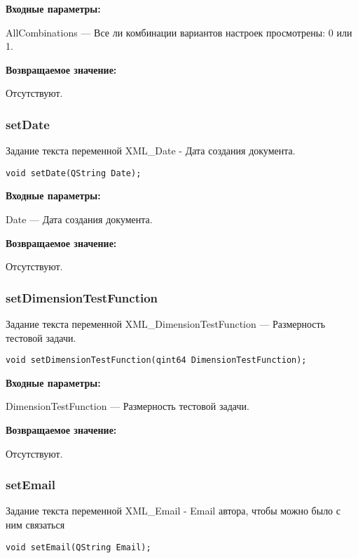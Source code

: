 \documentclass[a4paper,12pt]{article}
\begin{document}
\textbf{Входные параметры:}

AllCombinations --- Все ли комбинации вариантов настроек просмотрены: 0 или 1.

\textbf{Возвращаемое значение:}

Отсутствуют.


\subsubsection{setDate}\label{setDate}

Задание текста переменной  XML\_Date - Дата создания документа.


\begin{lstlisting}[label=code_syntax_setDate,caption=Синтаксис]
void setDate(QString Date);
\end{lstlisting}

\textbf{Входные параметры:}

Date --- Дата создания документа.

\textbf{Возвращаемое значение:}

Отсутствуют.


\subsubsection{setDimensionTestFunction}\label{setDimensionTestFunction}

Задание текста переменной  XML\_DimensionTestFunction --- Размерность тестовой задачи.


\begin{lstlisting}[label=code_syntax_setDimensionTestFunction,caption=Синтаксис]
void setDimensionTestFunction(qint64 DimensionTestFunction);
\end{lstlisting}

\textbf{Входные параметры:}

DimensionTestFunction --- Размерность тестовой задачи.

\textbf{Возвращаемое значение:}

Отсутствуют.


\subsubsection{setEmail}\label{setEmail}

Задание текста переменной  XML\_Email - Email автора, чтобы можно было с ним связаться


\begin{lstlisting}[label=code_syntax_setEmail,caption=Синтаксис]
void setEmail(QString Email);
\end{lstlisting}
\end{document}
